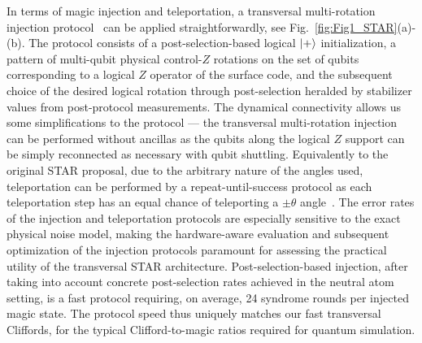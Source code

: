 \documentclass[aps, prx, reprint, superscriptaddress, longbibliography, floatfix]{revtex4-2}
\begin{document}
In terms of magic injection and teleportation, a transversal multi-rotation injection protocol~\cite{Choi2023, Toshio2024} can be applied straightforwardly, see Fig.~\ref{fig:Fig1_STAR}(a)-(b). The protocol consists of a post-selection-based logical $\ket{+}$ initialization, a pattern of multi-qubit physical control-$Z$ rotations on the set of qubits corresponding to a logical $Z$ operator of the surface code, and the subsequent choice of the desired logical rotation through post-selection heralded by stabilizer values from post-protocol measurements. The dynamical connectivity allows us some simplifications to the protocol --- the transversal multi-rotation injection can be performed without ancillas as the qubits along the logical $Z$ support can be simply reconnected as necessary with qubit shuttling. Equivalently to the original STAR proposal, due to the arbitrary nature of the angles used, teleportation can be performed by a repeat-until-success protocol as each teleportation step has an equal chance of teleporting a $\pm \theta$ angle~\cite{Akahoshi2024}. The error rates of the injection and teleportation protocols are especially sensitive to the exact physical noise model, making the hardware-aware evaluation and subsequent optimization of the injection protocols paramount for assessing the practical utility of the transversal STAR architecture. Post-selection-based injection, after taking into account concrete post-selection rates achieved in the neutral atom setting, is a fast protocol requiring, on average, 2\text{--}4 syndrome rounds per injected magic state. The protocol speed thus uniquely matches our fast transversal Cliffords, for the typical Clifford-to-magic ratios required for quantum simulation.
\end{document}
